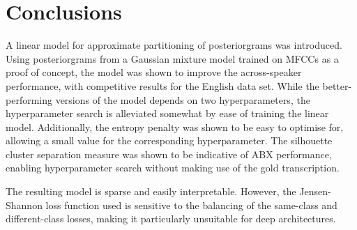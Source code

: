 \section{Conclusions}
A linear model for approximate partitioning of posteriorgrams was introduced.
Using posteriorgrams from a Gaussian mixture model trained on MFCCs as a proof of concept, the model was shown to improve the across-speaker performance, with competitive results for the English data set.
While the better-performing versions of the model depends on two hyperparameters, the hyperparameter search is alleviated somewhat by ease of training the linear model.
Additionally, the entropy penalty was shown to be easy to optimise for, allowing a small value for the corresponding hyperparameter.
The silhouette cluster separation measure was shown to be indicative of ABX performance, enabling hyperparameter search without making use of the gold transcription.

The resulting model is sparse and easily interpretable.
However, the Jensen-Shannon loss function used is sensitive to the balancing of the same-class and different-class losses, making it particularly unsuitable for deep architectures.

%
%



